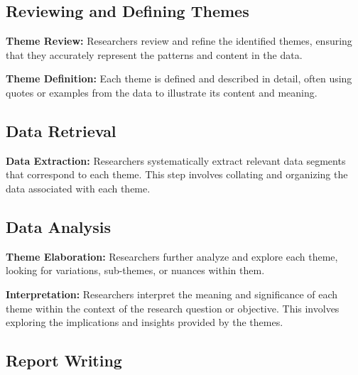 \documentclass[
  b5paper]{book}
\begin{document}
\hypertarget{reviewing-and-defining-themes}{%
\subsection*{\texorpdfstring{\textbf{Reviewing and Defining Themes}}{Reviewing and Defining Themes}}\label{reviewing-and-defining-themes}}

\textbf{Theme Review:} Researchers review and refine the identified themes, ensuring that they accurately represent the patterns and content in the data.

\textbf{Theme Definition:} Each theme is defined and described in detail, often using quotes or examples from the data to illustrate its content and meaning.

\hypertarget{data-retrieval}{%
\subsection*{\texorpdfstring{\textbf{Data Retrieval}}{Data Retrieval}}\label{data-retrieval}}

\textbf{Data Extraction:} Researchers systematically extract relevant data segments that correspond to each theme. This step involves collating and organizing the data associated with each theme.

\hypertarget{data-analysis}{%
\subsection*{\texorpdfstring{\textbf{Data Analysis}}{Data Analysis}}\label{data-analysis}}

\textbf{Theme Elaboration:} Researchers further analyze and explore each theme, looking for variations, sub-themes, or nuances within them.

\textbf{Interpretation:} Researchers interpret the meaning and significance of each theme within the context of the research question or objective. This involves exploring the implications and insights provided by the themes.

\hypertarget{report-writing}{%
\subsection*{\texorpdfstring{\textbf{Report Writing}}{Report Writing}}\label{report-writing}}
\end{document}
